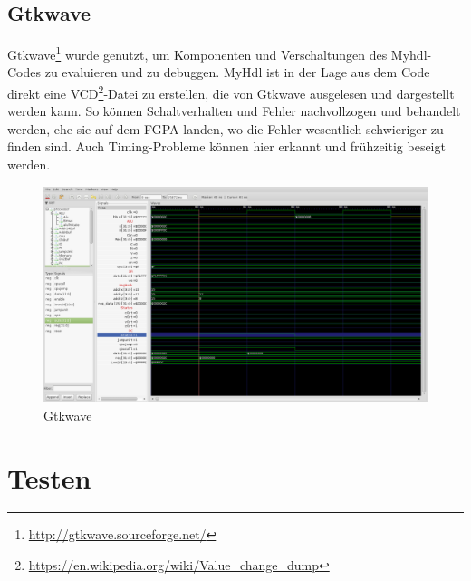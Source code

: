 \subsection{Gtkwave}
Gtkwave\footnote{\url{http://gtkwave.sourceforge.net/}} wurde genutzt, um Komponenten und Verschaltungen des Myhdl-Codes zu evaluieren und zu debuggen. MyHdl ist in der Lage aus dem Code direkt eine VCD\footnote{\url{https://en.wikipedia.org/wiki/Value_change_dump}}-Datei zu erstellen, die von Gtkwave ausgelesen und dargestellt werden kann. So können Schaltverhalten und Fehler nachvollzogen und behandelt werden, ehe sie auf dem FGPA landen, wo die Fehler wesentlich schwieriger zu finden sind. Auch Timing-Probleme können hier erkannt und frühzeitig beseigt werden.
\begin{figure}[H]
\centering
\includegraphics[width=\textwidth]{images/gtkwave.png}
\caption{\label{gen:gtkwave}Gtkwave}
\end{figure}

\section{Testen}
